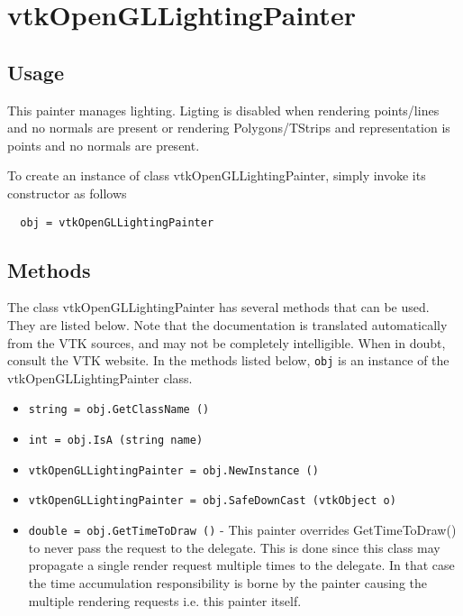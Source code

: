 \section{vtkOpenGLLightingPainter}

\subsection{Usage}

 This painter manages lighting.
 Ligting is disabled when rendering points/lines and no normals are present
 or rendering Polygons/TStrips and representation is points and no normals 
 are present.

To create an instance of class vtkOpenGLLightingPainter, simply
invoke its constructor as follows
\begin{verbatim}
  obj = vtkOpenGLLightingPainter
\end{verbatim}
\subsection{Methods}

The class vtkOpenGLLightingPainter has several methods that can be used.
  They are listed below.
Note that the documentation is translated automatically from the VTK sources,
and may not be completely intelligible.  When in doubt, consult the VTK website.
In the methods listed below, \verb|obj| is an instance of the vtkOpenGLLightingPainter class.
\begin{itemize}
\item  \verb|string = obj.GetClassName ()|

\item  \verb|int = obj.IsA (string name)|

\item  \verb|vtkOpenGLLightingPainter = obj.NewInstance ()|

\item  \verb|vtkOpenGLLightingPainter = obj.SafeDownCast (vtkObject o)|

\item  \verb|double = obj.GetTimeToDraw ()| -  This painter overrides GetTimeToDraw() to never pass the request to the
 delegate. This is done since this class may propagate a single render
 request multiple times to the delegate. In that case the time accumulation
 responsibility is borne by the painter causing the multiple rendering
 requests i.e. this painter itself.

\end{itemize}
